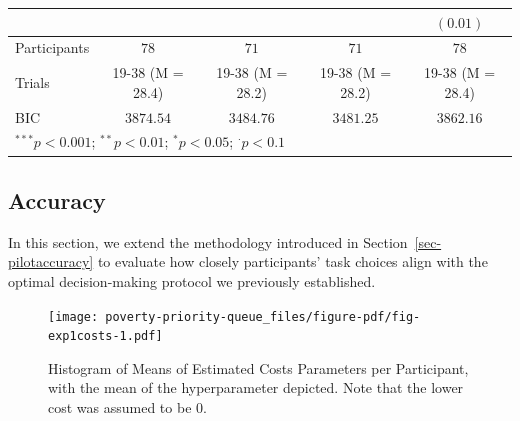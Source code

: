 \documentclass[
]{report}
\begin{document}
\begin{table}
\begin{minipage}[t]{\linewidth}
{\begin{center}
\begin{tabular}{l c c c c}
                       &                  &                  &                  & $(0.01)$         \\
\hline
Participants           & $78$             & $71$             & $71$             & $78$             \\
Trials                 & 19-38 (M = 28.4) & 19-38 (M = 28.2) & 19-38 (M = 28.2) & 19-38 (M = 28.4) \\
BIC                    & $3874.54$        & $3484.76$        & $3481.25$        & $3862.16$        \\
\hline
\multicolumn{5}{l}{\scriptsize{$^{***}p<0.001$; $^{**}p<0.01$; $^{*}p<0.05$; $^{\cdot}p<0.1$}}
\end{tabular}

\label{table:coefficients}
\end{center}

}

\end{minipage}%

\end{table}

\hypertarget{accuracy}{%
\subsection{Accuracy}\label{accuracy}}

In this section, we extend the methodology introduced in
Section~\ref{sec-pilotaccuracy} to evaluate how closely participants'
task choices align with the optimal decision-making protocol we
previously established.

\begin{figure}

{\centering \texttt{[image: poverty-priority-queue\_files/figure-pdf/fig-exp1costs-1.pdf]}

}

\caption{\label{fig-exp1costs}Histogram of Means of Estimated Costs
Parameters per Participant, with the mean of the hyperparameter
depicted. Note that the lower cost was assumed to be 0.}

\end{figure}
\end{document}
